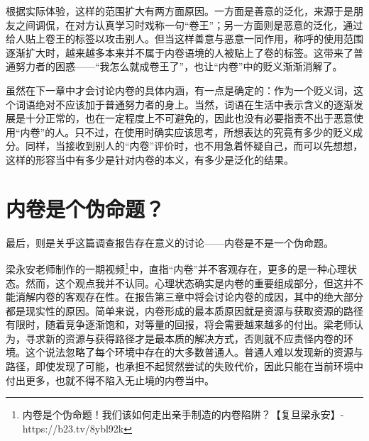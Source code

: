 \documentclass[UTF8,a4paper,fontset=windows,11pt,openany]{ctexbook}
\begin{document}
根据实际体验，这样的范围扩大有两方面原因。一方面是善意的泛化，来源于是朋友之间调侃，在对方认真学习时戏称一句“卷王”；另一方面则是恶意的泛化，通过给人贴上卷王的标签以攻击别人。但当这样善意与恶意一同作用，称呼的使用范围逐渐扩大时，越来越多本来并不属于内卷语境的人被贴上了卷的标签。这带来了普通努力者的困惑——“我怎么就成卷王了”，也让“内卷”中的贬义渐渐消解了。

虽然在下一章中才会讨论内卷的具体内涵，有一点是确定的：作为一个贬义词，这个词语绝对不应该加于普通努力者的身上。当然，词语在生活中表示含义的逐渐发展是十分正常的，也在一定程度上不可避免的，因此也没有必要指责不出于恶意使用“内卷”的人。只不过，在使用时确实应该思考，所想表达的究竟有多少的贬义成分。同样，当接收到别人的“内卷”评价时，也不用急着怀疑自己，而可以先想想，这样的形容当中有多少是针对内卷的本义，有多少是泛化的结果。

\section{内卷是个伪命题？}
最后，则是关乎这篇调查报告存在意义的讨论——内卷是不是一个伪命题。

梁永安老师制作的一期视频\footnote{内卷是个伪命题！我们该如何走出亲手制造的内卷陷阱？【复旦梁永安】- https://b23.tv/8ybl92k}中，直指“内卷”并不客观存在，更多的是一种心理状态。然而，这个观点我并不认同。心理状态确实是内卷的重要组成部分，但这并不能消解内卷的客观存在性。在报告第三章中将会讨论内卷的成因，其中的绝大部分都是现实性的原因。简单来说，内卷形成的最本质原因就是资源与获取资源的路径有限时，随着竞争逐渐饱和，对等量的回报，将会需要越来越多的付出。梁老师认为，寻求新的资源与获得路径才是最本质的解决方式，否则就不应责怪内卷的环境。这个说法忽略了每个环境中存在的大多数普通人。普通人难以发现新的资源与路径，即使发现了可能，也承担不起贸然尝试的失败代价，因此只能在当前环境中付出更多，也就不得不陷入无止境的内卷当中。
\end{document}
